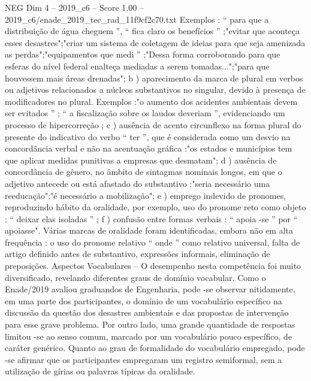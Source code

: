\begin{textsample}{NEG Dim 4 – 2019\_c6 – Score 1.00 – 2019\_c6/enade\_2019\_tec\_rad\_11f9cf2c70.txt}
Exemplos : “ para que a distribuição de água cheguem ”, “ fica claro os benefícios ” ;"evitar que aconteça esses desastres";"criar um sistema de coletagem de ideias para que seja amenizada as perdas";"equipamentos que medi ” ;"Dessa forma corroborando para que esferas do nível federal enalteça mediadas a serem tomadas...";"para que houvessem mais áreas drenadas"; b ) aparecimento da marca de plural em verbos ou adjetivos relacionados a núcleos substantivos no singular, devido à presença de modificadores no plural.
Exemplos :"o aumento dos acidentes ambientais devem ser evitados ” ; “ a fiscalização sobre os laudos deveriam ”, evidenciando um processo de hipercorreção ; c ) ausência de acento circunflexo na forma plural do presente do indicativo do verbo “ ter ”, que é considerada como um desvio na concordância verbal e não na acentuação gráfica :"os estados e municípios tem que aplicar medidas punitivas a empresas que desmatam"; d ) ausência de concordância de gênero, no âmbito de sintagmas nominais longos, em que o adjetivo antecede ou está afastado do substantivo :"seria necessário uma reeducação";"é necessário a mobilização"; e ) emprego indevido de pronomes, reproduzindo hábito da oralidade, por exemplo, uso do pronome reto como objeto : “ deixar elas isoladas ” ; f ) confusão entre formas verbais : “ apoia -se ” por “ apoiasse".
Várias marcas de oralidade foram identificadas, embora não em alta frequência : o uso do pronome relativo “ onde ” como relativo universal, falta de artigo definido antes de substantivo, expressões informais, eliminação de preposições.
Aspectos Vocabulares – O desempenho nesta competência foi muito diversificado, revelando diferentes graus de domínio vocabular.
Como o Enade/2019 avaliou graduandos de Engenharia, pode -se observar nitidamente, em uma parte dos participantes, o domínio de um vocabulário específico na discussão da questão dos desastres ambientais e das propostas de intervenção para esse grave problema.
Por outro lado, uma grande quantidade de respostas limitou -se ao senso comum, marcado por um vocabulário pouco específico, de caráter genérico.
Quanto ao grau de formalidade do vocabulário empregado, pode -se afirmar que os participantes empregaram um registro semiformal, sem a utilização de gírias ou palavras típicas da oralidade.

\end{textsample}
